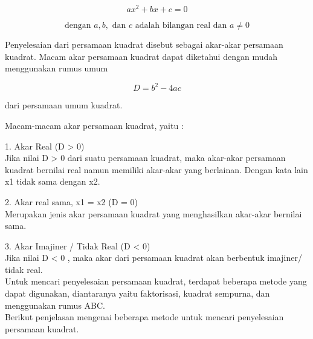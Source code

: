\begin{eulernotebook}
\begin{eulercomment}
\begin{eulercomment}
\begin{eulercomment}
\end{eulercomment}
\begin{eulerformula}
\[
\boxed {ax^2+bx+c=0}
\]
\end{eulerformula}
\begin{eulerformula}
\[
\text {dengan } a, b, \text { dan } c \text { adalah bilangan real dan } a \neq 0
\]
\end{eulerformula}
\begin{eulercomment}
Penyelesaian dari persamaan kuadrat disebut sebagai akar-akar
persamaan kuadrat. Macam akar persamaan kuadrat dapat diketahui dengan
mudah menggunakan rumus umum

\end{eulercomment}
\begin{eulerformula}
\[
\boxed{D = b^2-4ac}
\]
\end{eulerformula}
\begin{eulercomment}
dari persamaan umum kuadrat.

Macam-macam akar persamaan kuadrat, yaitu :

1. Akar Real (D \textgreater{} 0)\\
Jika nilai D \textgreater{} 0 dari suatu persamaan kuadrat, maka akar-akar
persamaan kuadrat bernilai real namun memiliki akar-akar yang
berlainan. Dengan kata lain x1 tidak sama dengan x2.

2. Akar real sama, x1 = x2 (D = 0)\\
Merupakan jenis akar persamaan kuadrat yang menghasilkan akar-akar
bernilai sama.

3. Akar Imajiner / Tidak Real (D \textless{} 0)\\
Jika nilai D \textless{} 0 , maka akar dari persamaan kuadrat akan berbentuk
imajiner/ tidak real.\\

Untuk mencari penyelesaian persamaan kuadrat, terdapat beberapa metode
yang dapat digunakan, diantaranya yaitu faktorisasi, kuadrat sempurna,
dan menggunakan rumus ABC.\\
Berikut penjelasan mengenai beberapa metode untuk mencari penyelesaian
persamaan kuadrat.


\end{eulercomment}
\end{eulercomment}
\end{eulercomment}
\end{eulernotebook}
